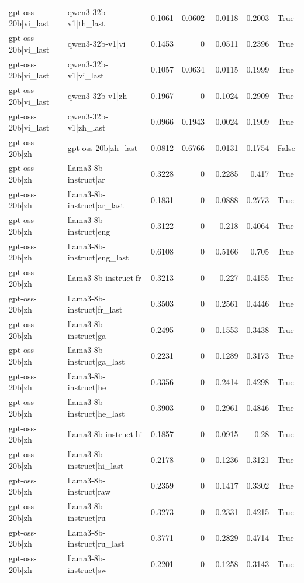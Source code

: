 \begin{table}
\begin{tabular}{l l r r r r l}
gpt-oss-20b|vi_last & qwen3-32b-v1|th_last & 0.1061 & 0.0602 & 0.0118 & 0.2003 & True \\
gpt-oss-20b|vi_last & qwen3-32b-v1|vi & 0.1453 & 0 & 0.0511 & 0.2396 & True \\
gpt-oss-20b|vi_last & qwen3-32b-v1|vi_last & 0.1057 & 0.0634 & 0.0115 & 0.1999 & True \\
gpt-oss-20b|vi_last & qwen3-32b-v1|zh & 0.1967 & 0 & 0.1024 & 0.2909 & True \\
gpt-oss-20b|vi_last & qwen3-32b-v1|zh_last & 0.0966 & 0.1943 & 0.0024 & 0.1909 & True \\
gpt-oss-20b|zh & gpt-oss-20b|zh_last & 0.0812 & 0.6766 & -0.0131 & 0.1754 & False \\
gpt-oss-20b|zh & llama3-8b-instruct|ar & 0.3228 & 0 & 0.2285 & 0.417 & True \\
gpt-oss-20b|zh & llama3-8b-instruct|ar_last & 0.1831 & 0 & 0.0888 & 0.2773 & True \\
gpt-oss-20b|zh & llama3-8b-instruct|eng & 0.3122 & 0 & 0.218 & 0.4064 & True \\
gpt-oss-20b|zh & llama3-8b-instruct|eng_last & 0.6108 & 0 & 0.5166 & 0.705 & True \\
gpt-oss-20b|zh & llama3-8b-instruct|fr & 0.3213 & 0 & 0.227 & 0.4155 & True \\
gpt-oss-20b|zh & llama3-8b-instruct|fr_last & 0.3503 & 0 & 0.2561 & 0.4446 & True \\
gpt-oss-20b|zh & llama3-8b-instruct|ga & 0.2495 & 0 & 0.1553 & 0.3438 & True \\
gpt-oss-20b|zh & llama3-8b-instruct|ga_last & 0.2231 & 0 & 0.1289 & 0.3173 & True \\
gpt-oss-20b|zh & llama3-8b-instruct|he & 0.3356 & 0 & 0.2414 & 0.4298 & True \\
gpt-oss-20b|zh & llama3-8b-instruct|he_last & 0.3903 & 0 & 0.2961 & 0.4846 & True \\
gpt-oss-20b|zh & llama3-8b-instruct|hi & 0.1857 & 0 & 0.0915 & 0.28 & True \\
gpt-oss-20b|zh & llama3-8b-instruct|hi_last & 0.2178 & 0 & 0.1236 & 0.3121 & True \\
gpt-oss-20b|zh & llama3-8b-instruct|raw & 0.2359 & 0 & 0.1417 & 0.3302 & True \\
gpt-oss-20b|zh & llama3-8b-instruct|ru & 0.3273 & 0 & 0.2331 & 0.4215 & True \\
gpt-oss-20b|zh & llama3-8b-instruct|ru_last & 0.3771 & 0 & 0.2829 & 0.4714 & True \\
gpt-oss-20b|zh & llama3-8b-instruct|sw & 0.2201 & 0 & 0.1258 & 0.3143 & True \\

\end{tabular}
\end{table}

